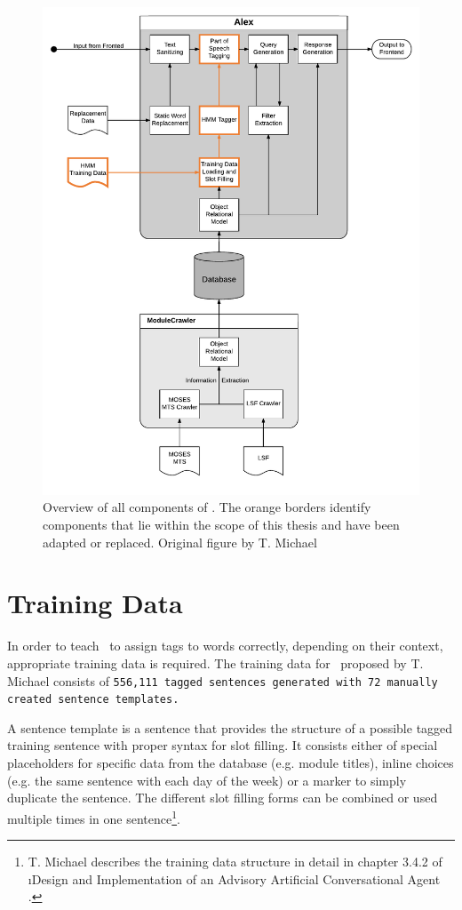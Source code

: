 \begin{figure}[H]
	\includegraphics[width=\textwidth]{images/alex_components}
	\caption[Component Overview of \Alex]{Overview of all components of \Alex. The orange borders identify components that lie within the scope of this thesis and have been adapted or replaced. Original figure by T. Michael \cite{michael2016}}
	\label{f.alex.components}
\end{figure}

\section{Training Data}\label{c.alex.data}
In order to teach \Alex\ to assign tags to words correctly, depending on their context, appropriate training data is required. The training data for \Alex\ proposed by T. Michael consists of \tt{556,111} tagged sentences generated with \tt{72} manually created sentence templates.

A sentence template is a sentence that provides the structure of a possible tagged training sentence with proper syntax for slot filling. It consists either of special placeholders for specific data from the database (e.g. module titles), inline choices (e.g. the same sentence with each day of the week) or a marker to simply duplicate the sentence. The different slot filling forms can be combined or used multiple times in one sentence\footnote{T. Michael describes the training data structure in detail in chapter 3.4.2 of \i{Design and Implementation of an Advisory Artificial Conversational Agent} \cite{michael2016}.}.

